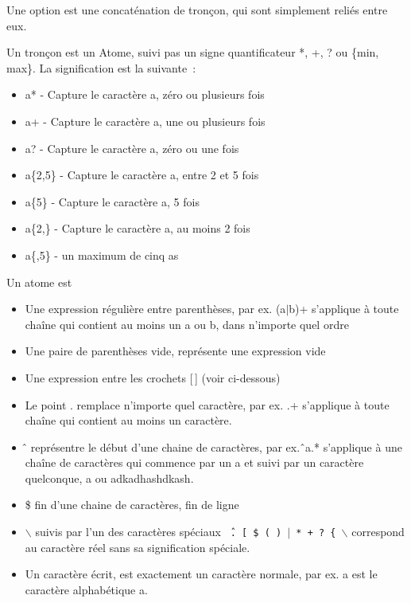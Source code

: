 Une option est une concaténation de tronçon, qui sont simplement reliés
entre eux.

Un tronçon est un \og{}Atome\fg{}, suivi pas un signe quantificateur \og{}*\fg{}, \og{}+\fg{},
\og{}?\fg{} ou \og{}\{min, max\}\fg{}. La signification est la suivante~:
\begin{itemize}
\item   \og{}a*\fg{} - Capture le caractère a, zéro ou plusieurs fois
\item   \og{}a+\fg{} - Capture le caractère a, une ou plusieurs fois
\item   \og{}a?\fg{} - Capture le caractère a, zéro ou une fois
\item   \og{}a\{2,5\}\fg{} - Capture le caractère a, entre 2 et 5 fois
\item   \og{}a\{5\}\fg{} - Capture le caractère a, 5 fois
\item   \og{}a\{2,\}\fg{} - Capture le caractère a, au moins 2 fois
\item   \og{}a\{,5\}\fg{} - un maximum de cinq \og{}a\fg{}s
\end{itemize}

Un \og{}atome\fg{} est
\begin{itemize}
        \item Une expression régulière entre parenthèses, par ex. \og{}(a$|$b)+\fg{} s'applique à
          toute chaîne qui contient au moins un \og{}a\fg{} ou \og{}b\fg{}, dans n'importe quel ordre
        \item Une paire de parenthèses vide, représente une expression \og{}vide\fg{}
        \item Une expression entre les crochets \og{}[\,]\fg{} (voir ci-dessous)
        \item Le point \og{}.\fg{} remplace n'importe quel caractère, par ex. \og{}.+\fg{}
          s'applique à toute chaîne qui contient au moins un caractère.
        \item \og{}\^\,\fg{} représentre le début d’une chaine de caractères, par ex.
          \og{}\^\,a.*\fg{} s'applique à une chaîne de caractères qui commence par un \og{}a\fg{} et
          suivi par un caractère quelconque, \og{}a\fg{} ou \og{}adkadhashdkash\fg{}.
        \item \og{}\$\fg{} fin d’une chaine de caractères, fin de ligne
        \item \og{}$\backslash$\fg{} suivis par l'un des caractères spéciaux
          \texttt{\^\,.\,[\,\$\,(\,)\,$|$\,*\,+\,?\,\{\,$\backslash$} correspond au caractère réel sans sa
          signification spéciale.
        \item Un caractère écrit, est exactement un caractère normale, par ex.
          \og{}a\fg{} est le caractère alphabétique \og{}a\fg{}.
\end{itemize}

